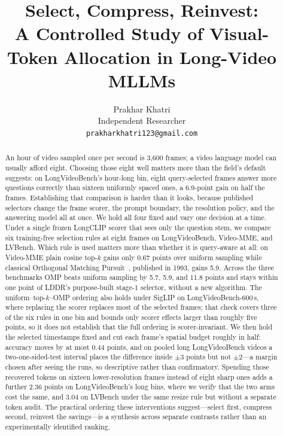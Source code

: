 \documentclass[11pt]{article}
\title{Select, Compress, Reinvest:\\A Controlled Study of Visual-Token Allocation in Long-Video MLLMs}
\author{Prakhar Khatri \\
  Independent Researcher \\
  \texttt{prakharkhatri123@gmail.com}}
\begin{document}
\maketitle

\begin{abstract}
An hour of video sampled once per second is 3{,}600 frames; a video language model can usually afford eight.
Choosing those eight well matters more than the field's default suggests: on LongVideoBench's hour-long bin, eight query-selected frames answer more questions correctly than sixteen uniformly spaced ones, a 6.9-point gain on half the frames.
Establishing that comparison is harder than it looks, because published selectors change the frame scorer, the prompt boundary, the resolution policy, and the answering model all at once.
We hold all four fixed and vary one decision at a time.
Under a single frozen LongCLIP scorer that sees only the question stem, we compare six training-free selection rules at eight frames on LongVideoBench, Video-MME, and LVBench.
Which rule is used matters more than whether it is query-aware at all: on Video-MME plain cosine top-$k$ gains only 0.67 points over uniform sampling while classical Orthogonal Matching Pursuit~\citep{pati1993omp}, published in 1993, gains 5.9.
Across the three benchmarks OMP beats uniform sampling by 5.7, 5.9, and 11.8 points and stays within one point of LDDR's purpose-built stage-1 selector, without a new algorithm.
The uniform--top-$k$--OMP ordering also holds under SigLIP on LongVideoBench-600\,s, where replacing the scorer replaces most of the selected frames; that check covers three of the six rules in one bin and bounds only scorer effects larger than roughly five points, so it does not establish that the full ordering is scorer-invariant.
We then hold the selected timestamps fixed and cut each frame's spatial budget roughly in half: accuracy moves by at most 0.44 points, and on pooled long LongVideoBench videos a two-one-sided-test interval places the difference inside $\pm3$ points but not $\pm2$---a margin chosen after seeing the runs, so descriptive rather than confirmatory.
Spending those recovered tokens on sixteen lower-resolution frames instead of eight sharp ones adds a further 2.36 points on LongVideoBench's long bins, where we verify that the two arms cost the same, and 3.04 on LVBench under the same resize rule but without a separate token audit.
The practical ordering these interventions suggest---select first, compress second, reinvest the savings---is a synthesis across separate contrasts rather than an experimentally identified ranking.

\end{abstract}
\end{document}
